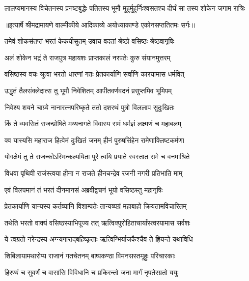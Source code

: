 \fourlineindentedshloka
{लालप्यमानस्य विचेतनस्य}
{ प्रनष्टबुद्धेः पतितस्य भूमौ}
{मुहुर्मुहुर्निःश्वसतश्च दीर्घं}
{ सा तस्य शोकेन जगाम रात्रिः} %


{॥इत्यार्षे श्रीमद्रामायणे वाल्मीकीये आदिकाव्ये अयोध्याकाण्डे एकोनसप्ततितमः सर्गः॥}


\twolineshloka
{तमेवं शोकसंतप्तं भरतं केकयीसुतम्}
{उवाच वदतां श्रेष्ठो वसिष्ठः श्रेष्ठवागृषिः} %

\twolineshloka
{अलं शोकेन भद्रं ते राजपुत्र महायशः}
{प्राप्तकालं नरपतेः कुरु संयानमुत्तरम्} %

\twolineshloka
{वसिष्ठस्य वचः श्रुत्वा भरतो धारणां गतः}
{प्रेतकार्याणि सर्वाणि कारयामास धर्मवित्} %

\twolineshloka
{उद्धृतं तैलसंक्लेदात्स तु भूमौ निवेशितम्}
{आपीतवर्णवदनं प्रसुप्तमिव भूमिपम्} %

\twolineshloka
{निवेश्य शयने चाग्र्ये नानारत्नपरिष्कृते}
{ततो दशरथं पुत्रो विललाप सुदुःखितः} %

\twolineshloka
{किं ते व्यवसितं राजन्प्रोषिते मय्यनागते}
{विवास्य रामं धर्मज्ञं लक्ष्मणं च महाबलम्} %

\twolineshloka
{क्व यास्यसि महाराज हित्वेमं दुःखितं जनम्}
{हीनं पुरुषसिंहेन रामेणाक्लिष्टकर्मणा} %

\twolineshloka
{योगक्षेमं तु ते राजन्कोऽस्मिन्कल्पयिता पुरे}
{त्वयि प्रयाते स्वस्तात रामे च वनमाश्रिते} %

\twolineshloka
{विधवा पृथिवी राजंस्त्वया हीना न राजते}
{हीनचन्द्रेव रजनी नगरी प्रतिभाति माम्} %

\twolineshloka
{एवं विलपमानं तं भरतं दीनमानसं}
{अब्रवीद्वचनं भूयो वसिष्ठस्तु महानृषिः} %

\twolineshloka
{प्रेतकार्याणि यान्यस्य कर्तव्यानि विशाम्पतेः}
{तान्यव्यग्रं महाबाहो क्रियतामविचारितम्} %

\twolineshloka
{तथेति भरतो वाक्यं वसिष्ठस्याभिपूज्य तत्}
{ऋत्विक्पुरोहिताचार्यांस्त्वरयामास सर्वशः} %

\twolineshloka
{ये त्वग्रतो नरेन्द्रस्य अग्न्यगाराद्बहिष्कृताः}
{ऋत्विग्भिर्याजकैश्चैव ते ह्रियन्ते यथाविधि} %

\twolineshloka
{शिबिलायामथारोप्य राजानं गतचेतनम्}
{बाष्पकण्ठा विमनसस्तमूहुः परिचारकाः} %

\twolineshloka
{हिरण्यं च सुवर्णं च वासांसि विविधानि च}
{प्रकिरन्तो जना मार्गं नृपतेरग्रतो ययुः} %

